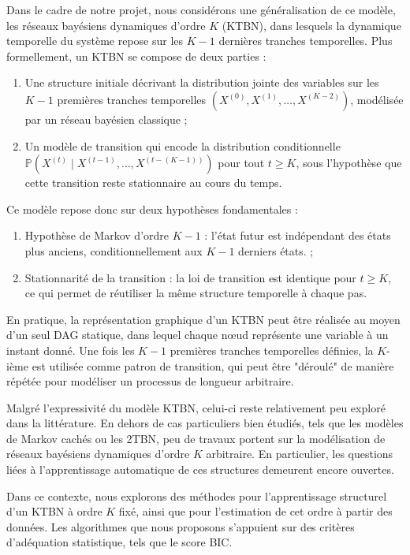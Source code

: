 \documentclass{article}
\begin{document}
Dans le cadre de notre projet, nous considérons une généralisation de ce modèle, les réseaux bayésiens dynamiques d'ordre $K$
(KTBN), dans lesquels la dynamique temporelle du système repose sur les $K-1$ dernières tranches temporelles. Plus
formellement, un KTBN se compose de deux parties :

\begin{enumerate}
    \item Une structure initiale décrivant la distribution jointe des variables sur les $K-1$ premières tranches
          temporelles $(X^{(0)}, X^{(1)}, \dots, X^{(K-2)})$, modélisée par un réseau bayésien classique ;
    \item Un modèle de transition qui encode la distribution conditionnelle
          $\mathbb{P}(X^{(t)} \mid X^{(t-1)}, \dots, X^{(t-(K-1))})$ pour tout $t \geq K$, sous l'hypothèse
          que cette transition reste stationnaire au cours du temps.
\end{enumerate}

Ce modèle repose donc sur deux hypothèses fondamentales :

\begin{enumerate}
    \item Hypothèse de Markov d'ordre $K-1$ :  l'état futur est indépendant des états plus anciens, conditionnellement
          aux $K-1$ derniers états. ;
    \item Stationnarité de la transition : la loi de transition est identique pour $t \geq K$, ce qui permet
          de réutiliser la même structure temporelle à chaque pas.
\end{enumerate}

En pratique, la représentation graphique d'un KTBN peut être réalisée au moyen d'un seul DAG statique, dans
lequel chaque nœud représente une variable à un instant donné. Une fois les $K-1$ premières tranches temporelles
définies, la $K$-ième est utilisée comme patron de transition, qui peut être "déroulé" de manière répétée pour
modéliser un processus de longueur arbitraire.

Malgré l'expressivité du modèle KTBN, celui-ci reste relativement peu exploré dans la littérature. En dehors
de cas particuliers bien étudiés, tels que les modèles de Markov cachés ou les 2TBN, peu de travaux portent
sur la modélisation de réseaux bayésiens dynamiques d'ordre $K$ arbitraire. En particulier, les questions liées
à l'apprentissage automatique de ces structures demeurent encore ouvertes.

Dans ce contexte, nous explorons des méthodes pour l'apprentissage structurel d'un KTBN à ordre $K$ fixé,
ainsi que pour l'estimation de cet ordre à partir des données. Les algorithmes que nous proposons s'appuient sur
des critères d'adéquation statistique, tels que le score BIC.
\end{document}
